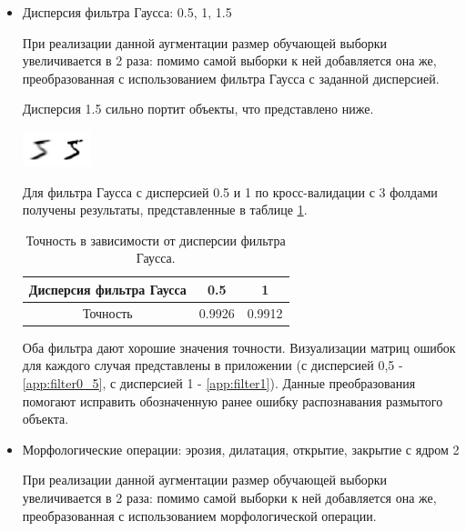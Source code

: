\documentclass{article}
\begin{document}
\begin{itemize}
    Данные преобразования помогают исправить обозначенную ранее ошибку распознавания сдвинутого объекта, причем лучшую точность дает смещение на 1 пиксель, а оставшиеся смещения количественно добавляют новые ошибки.

    
    \item Дисперсия фильтра Гаусса: 0.5, 1, 1.5
    
    При реализации данной аугментации размер обучающей выборки увеличивается в 2 раза: помимо самой выборки к ней добавляется она же, преобразованная с использованием фильтра Гаусса с заданной дисперсией.
    
    Дисперсия 1.5 сильно портит объекты, что представлено ниже. 
    
    \includegraphics[width=2cm]{TASK1 badgaus.png}
    
    Для фильтра Гаусса с дисперсией 0.5 и 1 по кросс-валидации с 3 фолдами получены результаты, представленные в таблице \ref{tab:widgets7}.
    
    \begin{table}[H]
    \begin{center}
    \begin{tabular}{|*{3}{c|}}\hline
    Дисперсия фильтра Гаусса & 0.5 & 1 \\\hline
    Точность &  0.9926 &  0.9912  \\\hline
    \end{tabular}
    \caption{\label{tab:widgets7} Точность в зависимости от дисперсии фильтра Гаусса.}
    \end{center}
    \end{table}
    
    Оба фильтра дают хорошие значения точности. Визуализации матриц ошибок для каждого случая представлены в приложении (с дисперсией 0,5 - \ref{app:filter0_5}, с дисперсией 1 - \ref{app:filter1}).
    Данные преобразования помогают исправить обозначенную ранее ошибку распознавания размытого объекта.
    
    \item Морфологические операции: эрозия, дилатация, открытие, закрытие с ядром 2
    
    При реализации данной аугментации размер обучающей выборки увеличивается в 2 раза: помимо самой выборки к ней добавляется она же, преобразованная с использованием морфологической операции.
    

\end{itemize}
\end{document}
